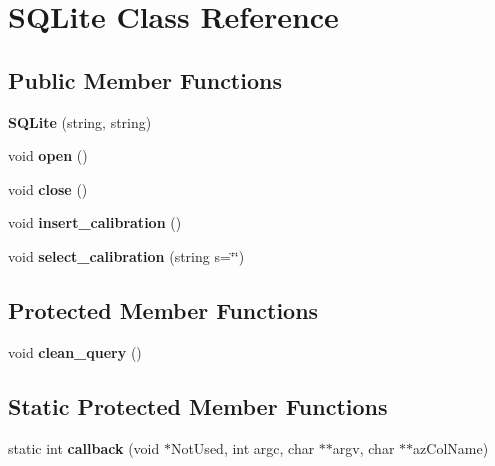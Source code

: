 \hypertarget{classSQLite}{}\section{S\+Q\+Lite Class Reference}
\label{classSQLite}
\subsection*{Public Member Functions}
\begin{DoxyCompactItemize}
\item 
{\bfseries S\+Q\+Lite} (string, string)\hypertarget{classSQLite_aec016ee26d918bb715383b7578118166}{}\label{classSQLite_aec016ee26d918bb715383b7578118166}

\item 
void {\bfseries open} ()\hypertarget{classSQLite_a2ba6d61d356aac7b2a0d7323ba997279}{}\label{classSQLite_a2ba6d61d356aac7b2a0d7323ba997279}

\item 
void {\bfseries close} ()\hypertarget{classSQLite_aac5338faf7580f6adb3560c91d58b54a}{}\label{classSQLite_aac5338faf7580f6adb3560c91d58b54a}

\item 
void {\bfseries insert\+\_\+calibration} ()\hypertarget{classSQLite_ae145e41fed72678f0e2900ec093ad323}{}\label{classSQLite_ae145e41fed72678f0e2900ec093ad323}

\item 
void {\bfseries select\+\_\+calibration} (string s=\char`\"{}\char`\"{})\hypertarget{classSQLite_aeb720971a449cc51d124251fa995cb5c}{}\label{classSQLite_aeb720971a449cc51d124251fa995cb5c}

\end{DoxyCompactItemize}
\subsection*{Protected Member Functions}
\begin{DoxyCompactItemize}
\item 
void {\bfseries clean\+\_\+query} ()\hypertarget{classSQLite_a3b7e7d4f78e02266bd7bb9b6eb4828ee}{}\label{classSQLite_a3b7e7d4f78e02266bd7bb9b6eb4828ee}

\end{DoxyCompactItemize}
\subsection*{Static Protected Member Functions}
\begin{DoxyCompactItemize}
\item 
static int {\bfseries callback} (void $\ast$Not\+Used, int argc, char $\ast$$\ast$argv, char $\ast$$\ast$az\+Col\+Name)\hypertarget{classSQLite_a2cdec2824226fb74b9c5f53fb2eb9c52}{}\label{classSQLite_a2cdec2824226fb74b9c5f53fb2eb9c52}

\end{DoxyCompactItemize}
